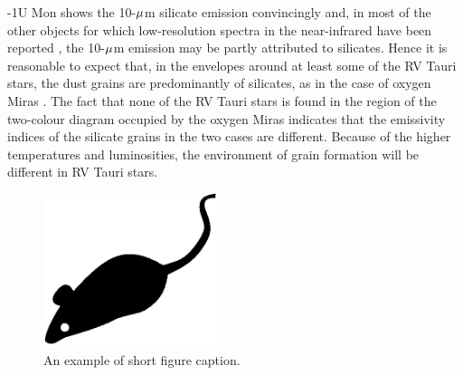 \documentclass[useAMS,usenatbib, referree]{biom}
\begin{document}
\looseness-1U Mon shows the 10-$\mu$m silicate emission convincingly and, in
most of the other objects for which low-resolution spectra in the
near-infrared have been reported \citep{b5,b19}, the 10-$\mu$m
emission may be partly attributed to silicates. Hence it is
reasonable to expect that, in the envelopes around at least some
of the RV Tauri stars, the dust grains are predominantly of
silicates, as in the case of oxygen Miras \citep{b21}. The fact
that none of the RV Tauri stars is found in the region of the
two-colour diagram occupied by the oxygen Miras indicates that the
emissivity indices of the silicate grains in the two cases are
different. Because of the higher temperatures and luminosities,
the environment of grain formation will be different in RV Tauri
stars.
\begin{figure}[b]
  \centerline{\includegraphics[width=2in]{mouse.eps}}
  \caption{An example of short figure caption.}
\vspace*{-3pt}
\label{f:shortmouse}
\end{figure}
\end{document}

